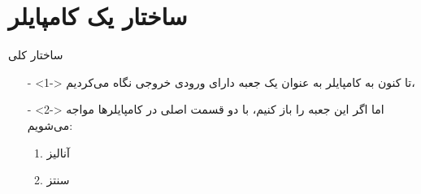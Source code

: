 \section{ساختار یک کامپایلر}
\begin{frame}{ساختار کلی}
\begin{itemize}\itemr
\item[-]<1->
تا کنون به کامپایلر به عنوان یک جعبه دارای ورودی خروجی نگاه می‌کردیم،
\item[-]<2->
اما اگر این جعبه را باز کنیم، با دو قسمت اصلی در کامپایلر‌ها مواجه می‌شویم:
\begin{enumerate}\itemr
\item 
آنالیز
\item 
سنتز
\end{enumerate}
\end{itemize}
\end{frame}